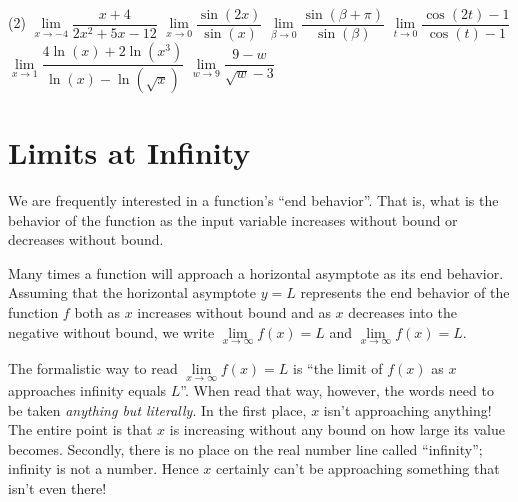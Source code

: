 \documentclass[12pt,]{book}
\theoremstyle{plain}
\theoremstyle{definition}
\numberwithin{equation}{section}
\newcommand{\fe}[2]{#1\mathopen{}\left(#2\right)\mathclose{}}
\begin{document}
\par
\begin{exercisegroup}(2)
\exercise[2.]\hypertarget{exercise-73}{\null}\(\lim\limits_{x\to-4}\dfrac{x+4}{2x^2+5x-12}\)%
\exercise[3.]\hypertarget{exercise-74}{\null}\(\lim\limits_{x\to0}\dfrac{\fe{\sin}{2x}}{\fe{\sin}{x}}\)%
\exercise[4.]\hypertarget{exercise-75}{\null}\(\lim\limits_{\beta\to0}\dfrac{\fe{\sin}{\beta+\pi}}{\fe{\sin}{\beta}}\)%
\exercise[5.]\hypertarget{exercise-76}{\null}\(\lim\limits_{t\to0}\dfrac{\fe{\cos}{2t}-1}{\fe{\cos}{t}-1}\)%
\exercise[6.]\hypertarget{exercise-77}{\null}\(\lim\limits_{x\to1}\dfrac{4\fe{\ln}{x}+2\fe{\ln}{x^3}}{\fe{\ln}{x}-\fe{\ln}{\sqrt{x}}}\)%
\exercise[7.]\hypertarget{exercise-78}{\null}\(\lim\limits_{w\to9}\dfrac{9-w}{\sqrt{w}-3}\)%
\end{exercisegroup}
\par\smallskip\noindent
\typeout{************************************************}
\typeout{************************************************}
\section[Limits at Infinity]{Limits at Infinity}\label{section-limits-at-infinity}
We are frequently interested in a function's ``end behavior''. That is, what is the behavior of the function as the input variable increases without bound or decreases without bound.%
\par
Many times a function will approach a horizontal asymptote as its end behavior. Assuming that the horizontal asymptote \(y=L\) represents the end behavior of the function \(f\) both as \(x\) increases without bound and as \(x\) decreases into the negative without bound, we write \(\lim\limits_{x\to\infty}\fe{f}{x}=L\) and \(\lim\limits_{x\to\infty}\fe{f}{x}=L\).%
\par
The formalistic way to read \(\lim\limits_{x\to\infty}\fe{f}{x}=L\) is ``the limit of \(\fe{f}{x}\) as \(x\) approaches infinity equals \(L\)''. When read that way, however, the words need to be taken \emph{anything but literally}. In the first place, \(x\) isn't approaching anything! The entire point is that \(x\) is increasing without any bound on how large its value becomes. Secondly, there is no place on the real number line called ``infinity''; infinity is not a number. Hence \(x\) certainly can't be approaching something that isn't even there!%
\typeout{************************************************}
\typeout{************************************************}
\end{document}
